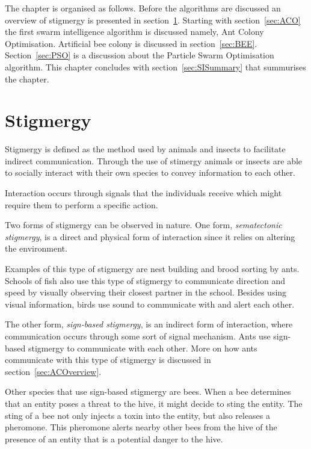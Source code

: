 The chapter is organised as follows. Before the algorithms are discussed an overview of stigmergy is presented in section~\ref{sec:stigmergy}. Starting with section~\ref{sec:ACO} the first swarm intelligence algorithm is discussed namely, Ant Colony Optimisation. Artificial bee colony is discussed in section~\ref{sec:BEE}. Section~\ref{sec:PSO} is a discussion about the Particle Swarm Optimisation algorithm. This chapter concludes with section~\ref{sec:SISummary} that summurises the chapter.

\section{Stigmergy}
\label{sec:stigmergy}
Stigmergy is defined as the method used by animals and insects to facilitate indirect communication\cite{CompuIntelligenceIntro,AntIntroTrends}. Through the use of stimergy animals or insects are able to socially interact with their own species to convey information to each other\cite{AntsAndStigmergy,FundamentalSwarm}.

Interaction occurs through signals that the individuals receive which might require them to perform a specific action\cite{AntsAndStigmergy,CompuIntelligenceIntro,AntIntroTrends}.

Two forms of stigmergy can be observed in nature. One form, \emph{sematectonic stigmergy}\label{def:sematectonic}, is a direct and physical form of interaction since it relies on altering the environment\cite{CompuIntelligenceIntro}. 

Examples of this type of stigmergy are nest building and brood sorting by ants\cite{CompuIntelligenceIntro}. Schools of fish also use this type of stigmergy to communicate direction and speed by visually observing their closest partner in the school. Besides using visual information, birds use sound to communicate with and alert each other\cite{SwarmArt}.

The other form, \emph{sign-based stigmergy}, is an indirect form of interaction, where communication occurs through some sort of signal mechanism\cite{CompuIntelligenceIntro}. Ants use sign-based stigmergy to communicate with each other. More on how ants communicate with this type of stigmergy is discussed in section~\ref{sec:ACOverview}.

Other species that use sign-based stigmergy are bees\cite{stigmergicoptimization}. When a bee determines that an entity poses a threat to the hive, it might decide to sting the entity. The sting of a bee not only injects a toxin into the entity, but also releases a pheromone\cite{stigmergicoptimization}. This pheromone alerts nearby other bees from the hive of the presence of an entity that is a potential danger to the hive\cite{stigmergicoptimization}. 

